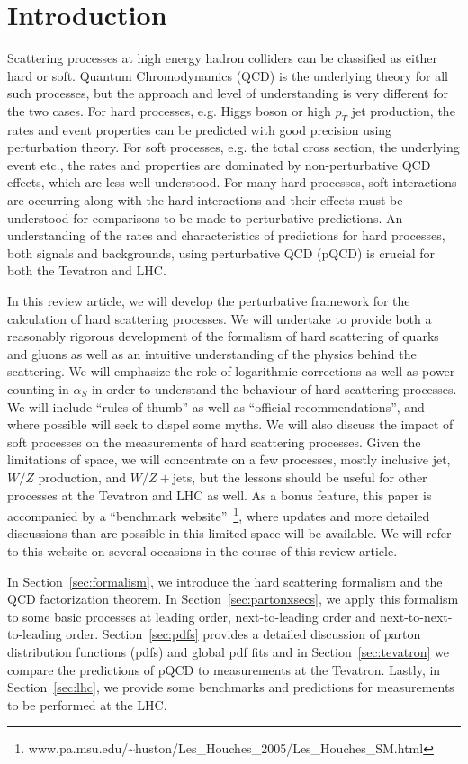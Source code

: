 \documentclass[12pt]{iopart}
\def\as{\alpha_S}
\begin{document}
\section{Introduction}
\label{sec:intro}

Scattering processes at high energy hadron colliders can be classified as either hard or soft. Quantum Chromodynamics (QCD)
is the underlying theory for all such processes, but the approach and level of understanding is very different for the two
cases. For hard processes, e.g. Higgs boson or high $p_T$ jet production, the rates and event properties can be predicted with
good precision using perturbation theory. For soft processes, e.g. the total cross section, the underlying event etc., the
rates and properties are dominated by non-perturbative QCD effects, which are less well understood.  For many hard
processes, soft interactions are occurring along with the hard interactions and their effects must be understood for
comparisons to be made to perturbative predictions. An understanding of the rates and characteristics of predictions for
hard processes, both signals and backgrounds, using perturbative QCD (pQCD) is crucial for both the Tevatron and LHC. 

In this review article, we will develop the perturbative framework for the calculation of hard scattering processes. We
will undertake to provide both  a reasonably rigorous development of the formalism of  hard scattering of quarks and gluons
as well as an intuitive understanding of the physics behind the scattering. We will emphasize the role of logarithmic
corrections as well as power counting in $\as$ in order to understand the behaviour of  hard scattering processes.  We
will include ``rules of thumb'' as well as ``official recommendations'', and where possible will seek to dispel some myths.
We will also discuss  the impact  of soft processes on the measurements  of hard scattering processes. Given the limitations
of space, we will concentrate on a few processes, mostly inclusive jet, $W/Z$ production, and $W/Z+$jets, but the lessons
should be useful for other processes at the Tevatron and LHC as well.
As a bonus feature, this paper is accompanied by a ``benchmark 
website''~\footnote{www.pa.msu.edu/\~{}huston/Les\_Houches\_2005/Les\_Houches\_SM.html}, where updates and more
detailed discussions than are possible in this limited space will be available. We will refer to this website on several
occasions in the course of this review article. 

In Section~\ref{sec:formalism}, we introduce the hard scattering formalism and the QCD factorization theorem. In
Section~\ref{sec:partonxsecs}, we apply this formalism to some basic processes at leading order, next-to-leading order and
next-to-next-to-leading order. Section~\ref{sec:pdfs} provides a detailed discussion of parton  distribution functions (pdfs) and
global pdf fits and in Section~\ref{sec:tevatron} we compare the predictions of pQCD to measurements at the Tevatron. Lastly, in
Section~\ref{sec:lhc}, we  provide some benchmarks and predictions for  measurements to be performed at the LHC. 
\end{document}
